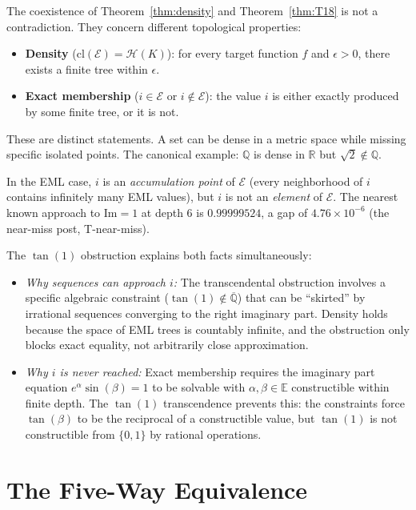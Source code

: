 \documentclass[11pt]{article}
\begin{document}
The coexistence of Theorem~\ref{thm:density} and Theorem~\ref{thm:T18} is not a
contradiction.  They concern different topological properties:

\begin{itemize}
\item \textbf{Density} ($\mathrm{cl}(\mathcal{E}) = \mathcal{H}(K)$): for every target
      function $f$ and $\epsilon > 0$, there exists a finite tree within $\epsilon$.
\item \textbf{Exact membership} ($i \in \mathcal{E}$ or $i \notin \mathcal{E}$):
      the value $i$ is either exactly produced by some finite tree, or it is not.
\end{itemize}

These are distinct statements.  A set can be dense in a metric space while missing
specific isolated points.  The canonical example: $\mathbb{Q}$ is dense in $\mathbb{R}$
but $\sqrt{2} \notin \mathbb{Q}$.

In the EML case, $i$ is an \emph{accumulation point} of $\mathcal{E}$
(every neighborhood of $i$ contains infinitely many EML values), but
$i$ is not an \emph{element} of $\mathcal{E}$.
The nearest known approach to $\mathrm{Im} = 1$ at depth 6 is $0.99999524$,
a gap of $4.76 \times 10^{-6}$ (the near-miss post, T-near-miss).

The $\tan(1)$ obstruction explains both facts simultaneously:
\begin{itemize}
\item \emph{Why sequences can approach $i$:}
      The transcendental obstruction involves a specific algebraic constraint
      ($\tan(1) \notin \overline{\mathbb{Q}}$) that can be ``skirted'' by
      irrational sequences converging to the right imaginary part.
      Density holds because the space of EML trees is countably infinite, and
      the obstruction only blocks exact equality, not arbitrarily close approximation.

\item \emph{Why $i$ is never reached:}
      Exact membership requires the imaginary part equation $e^\alpha \sin(\beta) = 1$
      to be solvable with $\alpha, \beta \in \mathbb{E}$ constructible within finite depth.
      The $\tan(1)$ transcendence prevents this: the constraints force $\tan(\beta)$
      to be the reciprocal of a constructible value, but $\tan(1)$ is not constructible
      from $\{0, 1\}$ by rational operations.
\end{itemize}

\section{The Five-Way Equivalence}
\end{document}
